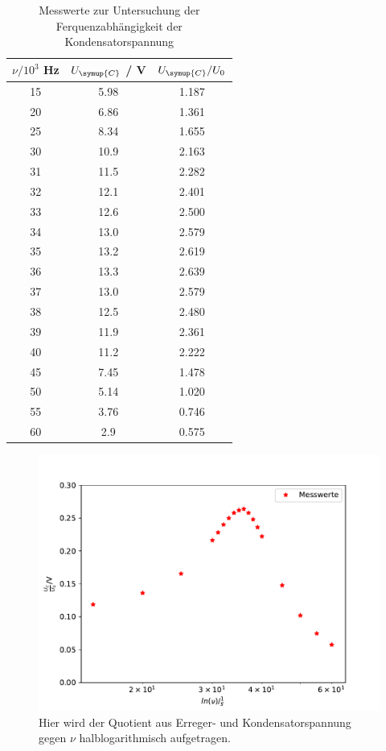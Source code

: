 \begin{table}
  \centering
  \caption{Messwerte zur Untersuchung der Ferquenzabhängigkeit der Kondensatorspannung}
  \label{tab:2}
  \begin{tabular}{c c c}
    \toprule
    {$\nu / 10^3$ Hz} & {$U_\symup{C}$ / V} & {$U_\symup{C} / U_0$} \\
    \midrule
    15  &  5.98  &  1.187 \\
    20  &  6.86  &  1.361 \\
    25  &  8.34  &  1.655 \\
    30  &  10.9  &  2.163 \\
    31  &  11.5  &  2.282 \\
    32  &  12.1  &  2.401 \\
    33  &  12.6  &  2.500 \\
    34  &  13.0  &  2.579 \\
    35  &  13.2  &  2.619 \\
    36  &  13.3  &  2.639 \\
    37  &  13.0  &  2.579 \\
    38  &  12.5  &  2.480 \\
    39  &  11.9  &  2.361 \\
    40  &  11.2  &  2.222 \\
    45  &  7.45  &  1.478 \\
    50  &  5.14  &  1.020 \\
    55  &  3.76  &  0.746 \\
    60  &  2.9   &  0.575 \\
    \bottomrule
  \end{tabular}
\end{table}

 \begin{figure}
  \centering
  \includegraphics[scale = 0.7]{plotC1.pdf}
  \caption{Hier wird der Quotient aus Erreger- und Kondensatorspannung gegen $\nu$ halblogarithmisch aufgetragen.}
  \label{Abb:9}
\end{figure}

